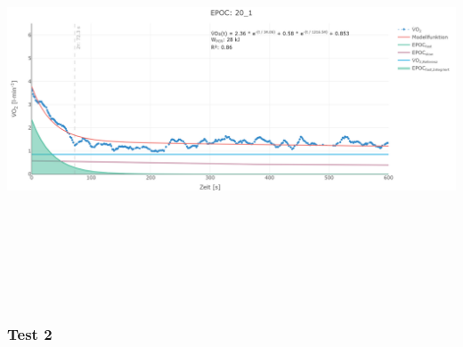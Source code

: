 \documentclass[
  letterpaper,
  DIV=11]{scrartcl}
\begin{document}
\includegraphics[width=11.45833in,height=4.6875in]{images/20_1.png}

\subsubsection{Test 2}
\end{document}
